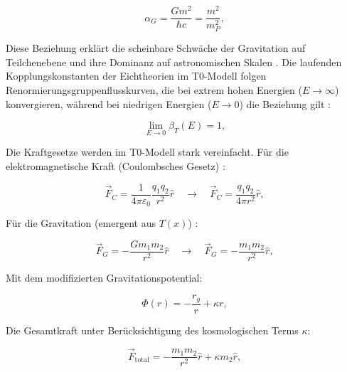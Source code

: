 \documentclass[twocolumn,aps,prl]{revtex4-2}
\begin{document}
{{{{{{{{{{{													\begin{equation}
														\alpha_G = \frac{G m^2}{\hbar c} = \frac{m^2}{m_P^2}, \label{eq:alpha_G}
													\end{equation}
													
													Diese Beziehung erklärt die scheinbare Schwäche der Gravitation auf Teilchenebene und ihre Dominanz auf astronomischen Skalen \cite{pascher_emergente_2025}. Die laufenden Kopplungskonstanten der Eichtheorien im T0-Modell folgen Renormierungsgruppenflusskurven, die bei extrem hohen Energien (\(E \to \infty\)) konvergieren, während bei niedrigen Energien (\(E \to 0\)) die Beziehung gilt \cite{Weinberg1989}:
													
													\begin{equation}
														\lim_{E \to 0} \beta_T(E) = 1, \label{eq:beta_IR_limit}
													\end{equation}
													
													Die Kraftgesetze werden im T0-Modell stark vereinfacht. Für die elektromagnetische Kraft (Coulombsches Gesetz) \cite{Feynman1985}:
													
													\begin{equation}
														\vec{F}_C = \frac{1}{4\pi \varepsilon_0} \frac{q_1 q_2}{r^2} \hat{r} \quad \to \quad \vec{F}_C = \frac{q_1 q_2}{4\pi r^2} \hat{r}, \label{eq:coulomb_t0}
													\end{equation}
													
													Für die Gravitation (emergent aus \(T(x)\)) \cite{pascher_emergente_2025}:
													
													\begin{equation}
														\vec{F}_G = -\frac{G m_1 m_2}{r^2} \hat{r} \quad \to \quad \vec{F}_G = -\frac{m_1 m_2}{r^2} \hat{r}, \label{eq:gravity_t0}
													\end{equation}
													
													Mit dem modifizierten Gravitationspotential:
													
													\begin{equation}
														\Phi(r) = -\frac{r_g}{r} + \kappa r, \label{eq:detailed_mod_potential}
													\end{equation}
													
													Die Gesamtkraft unter Berücksichtigung des kosmologischen Terms \(\kappa\):
													
													\begin{equation}
														\vec{F}_{\text{total}} = -\frac{m_1 m_2}{r^2} \hat{r} + \kappa m_2 \hat{r}, \label{eq:total_force}
													\end{equation}
													
}}}}}}}}}}}
\end{document}

